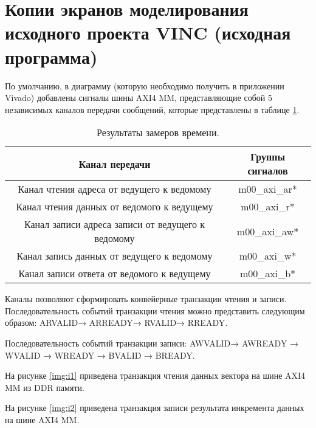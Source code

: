 \chapter*{Копии экранов моделирования исходного проекта VINC (исходная программа)}

По умолчанию, в диаграмму (которую необходимо получить в приложении Vivado) добавлены сигналы шины AXI4 MM, представляющие собой 5 независимых каналов передачи сообщений, которые представлены в таблице \ref{tab:t1}.

\begin{table}[h]
	\begin{center}
		\caption{\label{tab:t1}Результаты замеров времени.}
		\begin{tabular}{|c|c|}
			\hline
			Канал передачи & Группы сигналов \\
			\hline
			Канал чтения адреса от ведущего к ведомому & m00\_axi\_ar* \\
			\hline
			Канал чтения данных от ведомого к ведущему & m00\_axi\_r* \\
			\hline
			Канал записи адреса записи от ведущего к ведомому & m00\_axi\_aw* \\
			\hline
			Канал запись данных от ведущего к ведомому & m00\_axi\_w* \\
			\hline
			Канал записи ответа от ведомого к ведущему & m00\_axi\_b* \\
			\hline
		\end{tabular}
	\end{center}
\end{table}

Каналы позволяют сформировать конвейерные транзакции чтения и записи. Последовательность событий транзакции чтения можно представить следующим образом: ARVALID→ ARREADY→ RVALID→ RREADY.

Последовательность событий транзакции записи: AWVALID→ AWREADY → WVALID → WREADY → BVALID → BREADY.

На рисунке \ref{img:i1} приведена транзакция чтения данных вектора на шине AXI4 MM из DDR памяти.

\newpage

На рисунке \ref{img:i2} приведена транзакция записи результата инкремента данных на шине AXI4 MM.



